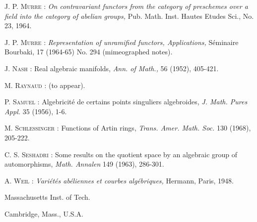 \begin{thebibliography}{99}
 \textsc{J. P. Murre :} {\em On contravariant functors from the category of preschemes over a field into the category of abelian groups,} Pub. Math. Inst. Hautes Etudes Sci., No. 23, 1964.

 \textsc{J. P. Murre :} {\em Representation of unramified functors, Applications,} S\'eminaire Bourbaki, 17 (1964-65) No. 294 (mimeographed notes).

 \textsc{J. Nash :} Real algebraic manifolds, {\em Ann. of Math.,} 56 (1952), 405-421.

 \textsc{M. Raynaud :} (to appear).

 \textsc{P. Samuel :} Algebricit\'e de certains points singuliers algebroides, {\em J. Math. Pures Appl.} 35 (1956), 1-6.

 \textsc{M. Schlessinger :} Functions of Artin rings, {\em Trans. Amer. Math. Soc.} 130 (1968), 205-222.

 \textsc{C. S. Seshadri :} Some results on the quotient space by an algebraic group of automorphisms, {\em Math. Annalen} 149 (1963), 286-301.

 \textsc{A. Weil :} {\em Vari\'et\'es ab\'eliennes et courbes alg\'ebriques,} Hermann, Paris, 1948.
\end{thebibliography}


\bigskip
\noindent
{\small Massachusetts Inst. of Tech.}

\noindent
{\small Cambridge, Mass., U.S.A.}

